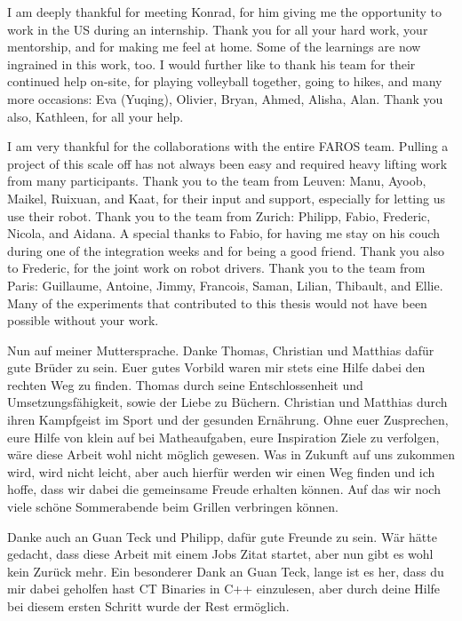I am deeply thankful for meeting Konrad, for him giving me the opportunity to work in the US during an internship. Thank you for all your hard work, your mentorship, and for making me feel at home. Some of the learnings are now ingrained in this work, too. I would further like to thank his team for their continued help on-site, for playing volleyball together, going to hikes, and many more occasions: Eva (Yuqing), Olivier, Bryan, Ahmed, Alisha, Alan. Thank you also, Kathleen, for all your help.

I am very thankful for the collaborations with the entire FAROS team. Pulling a project of this scale off has not always been easy and required heavy lifting work from many participants. Thank you to the team from Leuven: Manu, Ayoob, Maikel, Ruixuan, and Kaat, for their input and support, especially for letting us use their robot. Thank you to the team from Zurich: Philipp, Fabio, Frederic, Nicola, and Aidana. A special thanks to Fabio, for having me stay on his couch during one of the integration weeks and for being a good friend. Thank you also to Frederic, for the joint work on robot drivers. Thank you to the team from Paris: Guillaume, Antoine, Jimmy, Francois, Saman, Lilian, Thibault, and Ellie. Many of the experiments that contributed to this thesis would not have been possible without your work.

Nun auf meiner Muttersprache. Danke Thomas, Christian und Matthias dafür gute Brüder zu sein. Euer gutes Vorbild waren mir stets eine Hilfe dabei den rechten Weg zu finden. Thomas durch seine Entschlossenheit und Umsetzungsfähigkeit, sowie der Liebe zu Büchern. Christian und Matthias durch ihren Kampfgeist im Sport und der gesunden Ernährung. Ohne euer Zusprechen, eure Hilfe von klein auf bei Matheaufgaben, eure Inspiration Ziele zu verfolgen, wäre diese Arbeit wohl nicht möglich gewesen. Was in Zukunft auf uns zukommen wird, wird nicht leicht, aber auch hierfür werden wir einen Weg finden und ich hoffe, dass wir dabei die gemeinsame Freude erhalten können. Auf das wir noch viele schöne Sommerabende beim Grillen verbringen können.

Danke auch an Guan Teck und Philipp, dafür gute Freunde zu sein. Wär hätte gedacht, dass diese Arbeit mit einem Jobs Zitat startet, aber nun gibt es wohl kein Zurück mehr. Ein besonderer Dank an Guan Teck, lange ist es her, dass du mir dabei geholfen hast CT Binaries in C++ einzulesen, aber durch deine Hilfe bei diesem ersten Schritt wurde der Rest ermöglich.  

